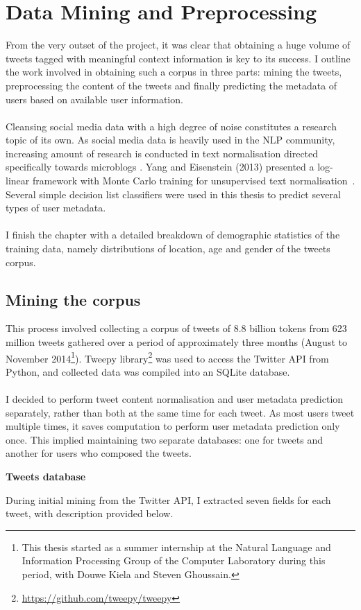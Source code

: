 \documentclass[a4paper,12pt,twoside,openright]{report}
\newcommand{\tb}{\vspace{10pt} \textbf}
\newcommand{\nl}{\\ \\}
\begin{document}
\chapter{Data Mining and Preprocessing} \label{ch3}

From the very outset of the project, it was clear that obtaining a huge volume of tweets tagged with meaningful context information is key to its success. I outline the work involved in obtaining such a corpus in three parts: mining the tweets, preprocessing the content of the tweets and finally predicting the metadata of users based on available user information.
\nl
Cleansing social media data with a high degree of noise constitutes a research topic of its own. As social media data is heavily used in the NLP community, increasing amount of research is conducted in text normalisation directed specifically towards microblogs . Yang and Eisenstein (2013) presented a log-linear framework with Monte Carlo training for unsupervised text normalisation~\cite{yang13}. Several simple decision list classifiers were used in this thesis to predict several types of user metadata.
\nl
I finish the chapter with a detailed breakdown of demographic statistics of the training data, namely distributions of location, age and gender of the tweets corpus.

\section{Mining the corpus}

This process involved collecting a corpus of tweets of 8.8 billion tokens from 623 million tweets gathered over a period of approximately three months (August to November 2014\footnote{This thesis started as a summer internship at the Natural Language and Information Processing Group of the Computer Laboratory during this period, with Douwe Kiela and Steven Ghoussain.}). Tweepy library\footnote{\url{https://github.com/tweepy/tweepy}} was used to access the Twitter API from Python, and collected data was compiled into an SQLite database. 
\nl
I decided to perform tweet content normalisation and user metadata prediction separately, rather than both at the same time for each tweet. As most users tweet multiple times, it saves computation to perform user metadata prediction only once. This implied maintaining two separate databases: one for tweets and another for users who composed the tweets.

\tb{Tweets database}

During initial mining from the Twitter API, I extracted seven fields for each tweet, with description provided below.
\end{document}

